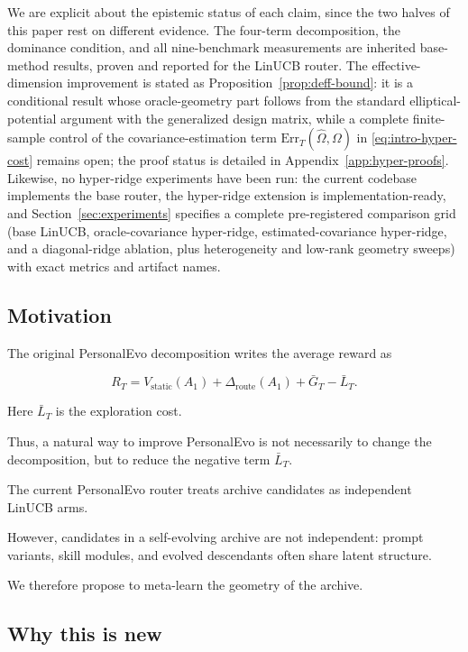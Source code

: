 \documentclass{article} %
\providecommand{\Rstatic}{V_{\mathrm{static}}}
\providecommand{\Droute}{\Delta_{\mathrm{route}}}
\begin{document}
We are explicit about the epistemic status of each claim, since the two halves of this paper rest on different evidence. The four-term decomposition, the dominance condition, and all nine-benchmark measurements are inherited base-method results, proven and reported for the LinUCB router. The effective-dimension improvement is stated as Proposition~\ref{prop:deff-bound}: it is a conditional result whose oracle-geometry part follows from the standard elliptical-potential argument with the generalized design matrix, while a complete finite-sample control of the covariance-estimation term $\mathrm{Err}_T(\widehat\Omega,\Omega)$ in \eqref{eq:intro-hyper-cost} remains open; the proof status is detailed in Appendix~\ref{app:hyper-proofs}. Likewise, no hyper-ridge experiments have been run: the current codebase implements the base router, the hyper-ridge extension is implementation-ready, and Section~\ref{sec:experiments} specifies a complete pre-registered comparison grid (base LinUCB, oracle-covariance hyper-ridge, estimated-covariance hyper-ridge, and a diagonal-ridge ablation, plus heterogeneity and low-rank geometry sweeps) with exact metrics and artifact names.

\subsection{Motivation}

The original PersonalEvo decomposition writes the average reward as

\[
R_T = \Rstatic(A_1) + \Droute(A_1) + \bar{G}_T - \bar{L}_T .
\]

Here $\bar{L}_T$ is the exploration cost.

Thus, a natural way to improve
PersonalEvo is not necessarily to change the decomposition, but to reduce the
negative term $\bar{L}_T$.

The current PersonalEvo router treats archive candidates as independent LinUCB
arms.

However, candidates in a self-evolving archive are not independent:
prompt variants, skill modules, and evolved descendants often share latent
structure.

We therefore propose to meta-learn the geometry of the archive.

\begin{center}
\end{center}

\subsection{Why this is new}
\end{document}
